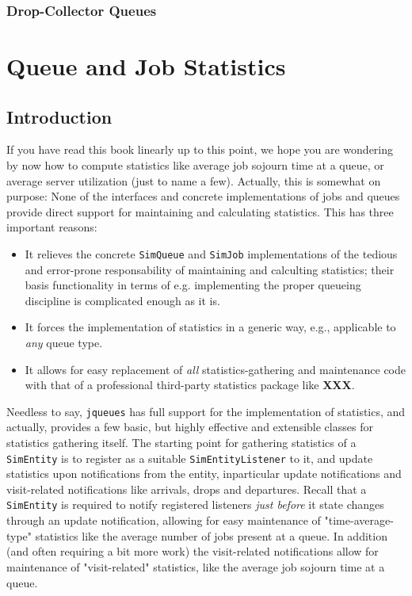 \documentclass[12pt]{book}
\begin{document}
\subsection{Drop-Collector Queues}

\chapter{Queue and Job Statistics}

\section{Introduction}
\label{stat-intro}

If you have read this book linearly up to this point,
  we hope you are wondering by now how to compute
  statistics like average job sojourn time at a queue,
  or average server utilization (just to name a few).
Actually, this is somewhat on purpose: None of the
  interfaces and concrete implementations
  of jobs and queues
  provide direct support for maintaining and calculating statistics.
This has three important reasons:
\begin{itemize}
\item It relieves the concrete \lstinline|SimQueue|
        and \lstinline|SimJob| implementations of the
        tedious and error-prone responsability of
        maintaining and calculting statistics;
        their basis functionality in terms of
        e.g. implementing the proper queueing discipline is
        complicated enough as it is.
\item It forces the implementation of statistics in a generic way,
      e.g., applicable to {\em any\/} queue type.
\item It allows for easy replacement of {\em all\/} statistics-gathering
        and maintenance code with that of a professional
        third-party statistics package like {\bf XXX}.
\end{itemize}

Needless to say, \lstinline|jqueues| has full support for the implementation of
  statistics, and actually, provides a few basic, but highly effective and extensible
  classes for statistics gathering itself.
The starting point for gathering statistics of a \lstinline|SimEntity|
  is to register as a suitable \lstinline|SimEntityListener| to it,
  and update statistics upon notifications from the entity,
  inparticular update notifications and
  visit-related notifications like arrivals, drops and departures.
Recall that a \lstinline|SimEntity| is required to notify registered listeners
  {\em just before\/} it state changes through an update notification,
  allowing for easy maintenance of "time-average-type" statistics
  like the average number of jobs present at a queue.
In addition (and often requiring a bit more work) the visit-related notifications
  allow for maintenance of "visit-related" statistics,
  like the average job sojourn time at a queue.
\end{document}
